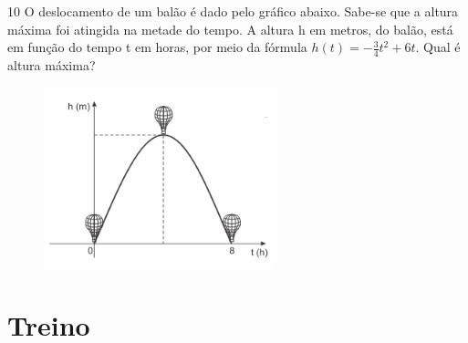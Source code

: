 \begin{escolha}
\begin{escolha}
\begin{largebox}
\end{largebox}

\num{10} O deslocamento de um balão é dado pelo gráfico abaixo. Sabe-se que a
altura máxima foi atingida na metade do tempo. A altura h em metros, do
balão, está em função do tempo t em horas, por meio da fórmula 
$h(t) = - \frac{3}{4} t^2 + 6t$. Qual é altura máxima?

\begin{figure}
\centering
\includegraphics[width=2.62523in,height=2.05851in]{./_SAEB_9_MAT/media/image154.png}
\end{figure}

\begin{boxpeq}
\end{boxpeq}

\section{Treino}


\end{escolha}
\end{escolha}
